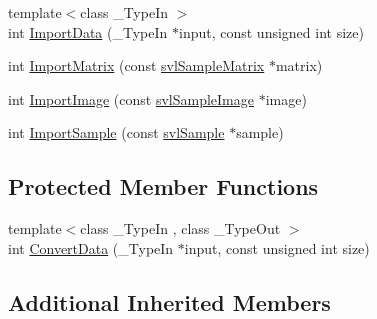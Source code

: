 \begin{DoxyCompactItemize}
{\footnotesize template$<$class \-\_\-\-Type\-In $>$ }\\int \hyperlink{classsvl_sample_matrix_a365e3fd1641464838588992df9bf027b}{Import\-Data} (\-\_\-\-Type\-In $\ast$input, const unsigned int size)
\item 
int \hyperlink{classsvl_sample_matrix_a7587d562d882c0e8865dc5ec85914ac6}{Import\-Matrix} (const \hyperlink{classsvl_sample_matrix}{svl\-Sample\-Matrix} $\ast$matrix)
\item 
int \hyperlink{classsvl_sample_matrix_a1ce5e5b42dd82f2c4791093a57146060}{Import\-Image} (const \hyperlink{classsvl_sample_image}{svl\-Sample\-Image} $\ast$image)
\item 
int \hyperlink{classsvl_sample_matrix_ae0d8221da045f6bcc33a96e447ed3d09}{Import\-Sample} (const \hyperlink{classsvl_sample}{svl\-Sample} $\ast$sample)
\end{DoxyCompactItemize}
\subsection*{Protected Member Functions}
\begin{DoxyCompactItemize}
\item 
{\footnotesize template$<$class \-\_\-\-Type\-In , class \-\_\-\-Type\-Out $>$ }\\int \hyperlink{classsvl_sample_matrix_a5d6992caddabeec52e4e5fae89b9e7af}{Convert\-Data} (\-\_\-\-Type\-In $\ast$input, const unsigned int size)
\end{DoxyCompactItemize}
\subsection*{Additional Inherited Members}


